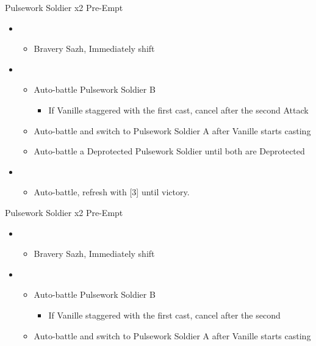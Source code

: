 \begin{paracol}{2}
	\begin{battle}{Pulsework Soldier x2 Pre-Empt}
		\begin{itemize}
			\item \second
			      \begin{itemize}
				      \item Bravery Sazh, Immediately shift
			      \end{itemize}
			\item \third
			      \begin{itemize}
				      \item Auto-battle Pulsework Soldier B
				            \begin{itemize}
					            \item If Vanille staggered with the first cast, cancel after the second Attack
				            \end{itemize}
				      \item Auto-battle and switch to Pulsework Soldier A after Vanille starts casting
				      \item Auto-battle a Deprotected Pulsework Soldier until both are Deprotected
			      \end{itemize}
			\item \first
			      \begin{itemize}
				      \item Auto-battle, refresh with [3] until victory.
			      \end{itemize}
		\end{itemize}
	\end{battle}
	\switchcolumn
	\begin{battle}{Pulsework Soldier x2 Pre-Empt}
		\begin{itemize}
			\item \second
			      \begin{itemize}
				      \item Bravery Sazh, Immediately shift
			      \end{itemize}
			\item \third
			      \begin{itemize}
				      \item Auto-battle Pulsework Soldier B
				            \begin{itemize}
					            \item If Vanille staggered with the first cast, cancel after the second
				            \end{itemize}
				      \item Auto-battle and switch to Pulsework Soldier A after Vanille starts casting

\end{itemize}
\end{itemize}
\end{battle}
\end{paracol}
